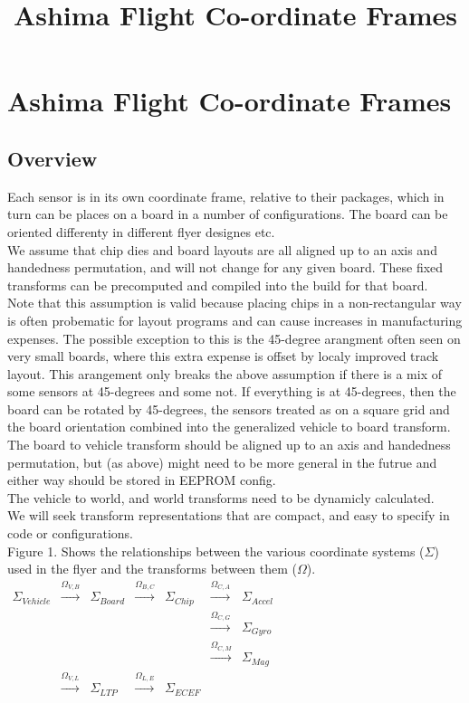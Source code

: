 \documentclass{article}
\begin{document}
\title{Ashima Flight Co-ordinate Frames}
\section{Ashima Flight Co-ordinate Frames}
\subsection{Overview}
Each sensor is in its own coordinate frame, relative to their
packages, which in turn can be places on a board in a number of
configurations. The board can be oriented differenty in different
flyer designes etc.
\\
We assume that chip dies and board layouts are all aligned up to
an axis and handedness permutation, and will not change for any
given board. These fixed transforms can be precomputed and compiled
into the build for that board.
\\
Note that this assumption is valid because placing chips in a
non-rectangular way is often probematic for layout programs and can
cause increases in manufacturing expenses. The possible exception
to this is the 45-degree arangment often seen on very small boards,
where this extra expense is offset by localy improved track layout.
This arangement only breaks the above assumption if there is a mix of
some sensors at 45-degrees and some not. If everything is at
45-degrees, then the board can be rotated by 45-degrees, the sensors
treated as on a square grid and the board orientation combined into the
generalized vehicle to board transform.
\\
The board to vehicle transform should be aligned up to an axis and
handedness permutation, but (as above) might need to be more general in the
futrue and either way should be stored in EEPROM config.
\\
The vehicle to world, and world transforms need to be dynamicly calculated.
\\
We will seek transform representations that are compact, and easy to specify in code
or configurations.
\\
Figure 1. Shows the relationships between the various coordinate
systems ($\Sigma$) used in the flyer and the transforms between them ($\Omega$).
\\
$\begin{matrix}
\Sigma_{Vehicle} & \xrightarrow{\Omega_{V,B}} & \Sigma_{Board} & \xrightarrow{\Omega_{B,C}} &
  \Sigma_{Chip} & \xrightarrow{\Omega_{C,A}} & \Sigma_{Accel} \\
&&&&&\xrightarrow{\Omega_{C,G}} & \Sigma_{Gyro}\\
&&&&&\xrightarrow{\Omega_{C,M}} & \Sigma_{Mag}\\
&\xrightarrow{\Omega_{V,L}} & \Sigma_{LTP} & \xrightarrow{\Omega_{L,E}} & \Sigma_{ECEF}\\
\end{matrix}$\\
\end{document}
